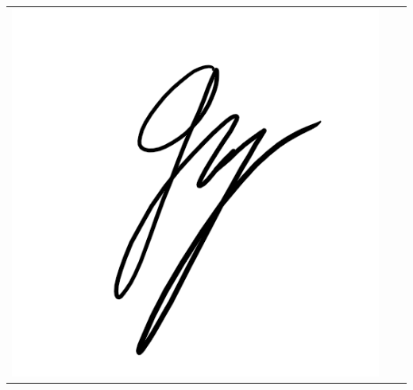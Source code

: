 \documentclass[12pt]{article}
\begin{document}
\begin{tabular}{p{6.5cm}p{6.5cm}p{6.5cm}}
\includegraphics[scale=0.6]{unterschriftGoekhan}
\end{tabular}
 
\end{document}
